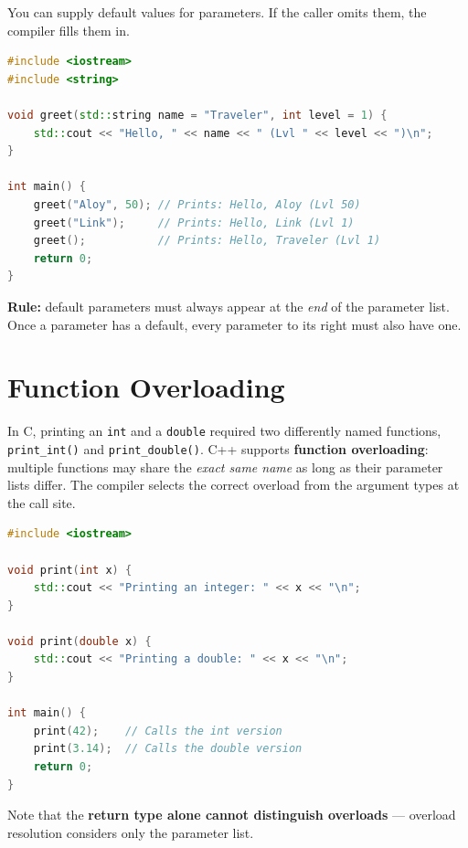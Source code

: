 You can supply default values for parameters. If the caller omits them, the compiler fills them in.

\begin{lstlisting}[language=C++, caption={Default parameter values}]
#include <iostream>
#include <string>

void greet(std::string name = "Traveler", int level = 1) {
    std::cout << "Hello, " << name << " (Lvl " << level << ")\n";
}

int main() {
    greet("Aloy", 50); // Prints: Hello, Aloy (Lvl 50)
    greet("Link");     // Prints: Hello, Link (Lvl 1)
    greet();           // Prints: Hello, Traveler (Lvl 1)
    return 0;
}
\end{lstlisting}

\textbf{Rule:} default parameters must always appear at the \textit{end} of the parameter list. Once a parameter has a default, every parameter to its right must also have one.

\section{Function Overloading}
\label{sec:function-overloading}

In C, printing an \texttt{int} and a \texttt{double} required two differently named functions, \texttt{print\_int()} and \texttt{print\_double()}. C++ supports \textbf{function overloading}: multiple functions may share the \textit{exact same name} as long as their parameter lists differ. The compiler selects the correct overload from the argument types at the call site.

\begin{lstlisting}[language=C++, caption={Two overloads of print}]
#include <iostream>

void print(int x) {
    std::cout << "Printing an integer: " << x << "\n";
}

void print(double x) {
    std::cout << "Printing a double: " << x << "\n";
}

int main() {
    print(42);    // Calls the int version
    print(3.14);  // Calls the double version
    return 0;
}
\end{lstlisting}

Note that the \textbf{return type alone cannot distinguish overloads} --- overload resolution considers only the parameter list.

